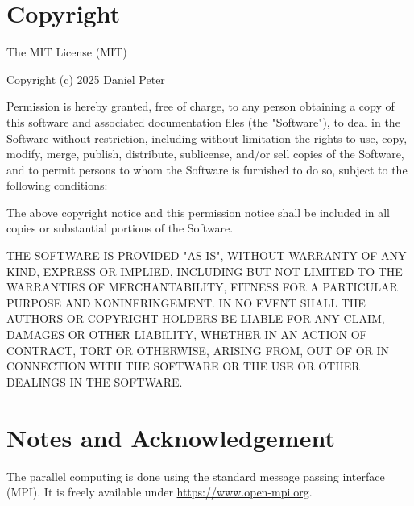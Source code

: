\documentclass[a4paper,
                          headsepline,
                          listof=totoc,
                          toc=listof,
                          headings=small]{scrreprt} %
\begin{document}
\chapter{Copyright}

The MIT License (MIT)

Copyright (c) 2025 Daniel Peter

Permission is hereby granted, free of charge, to any person obtaining a copy
of this software and associated documentation files (the "Software"), to deal
in the Software without restriction, including without limitation the rights
to use, copy, modify, merge, publish, distribute, sublicense, and/or sell
copies of the Software, and to permit persons to whom the Software is
furnished to do so, subject to the following conditions:

The above copyright notice and this permission notice shall be included in all
copies or substantial portions of the Software.

THE SOFTWARE IS PROVIDED "AS IS", WITHOUT WARRANTY OF ANY KIND, EXPRESS OR
IMPLIED, INCLUDING BUT NOT LIMITED TO THE WARRANTIES OF MERCHANTABILITY,
FITNESS FOR A PARTICULAR PURPOSE AND NONINFRINGEMENT. IN NO EVENT SHALL THE
AUTHORS OR COPYRIGHT HOLDERS BE LIABLE FOR ANY CLAIM, DAMAGES OR OTHER
LIABILITY, WHETHER IN AN ACTION OF CONTRACT, TORT OR OTHERWISE, ARISING FROM,
OUT OF OR IN CONNECTION WITH THE SOFTWARE OR THE USE OR OTHER DEALINGS IN THE
SOFTWARE.


\chapter{Notes and Acknowledgement}

The parallel computing is done using the standard message passing interface (MPI).
It is freely available under \href{https://www.open-mpi.org}{https://www.open-mpi.org}.


\end{document}
